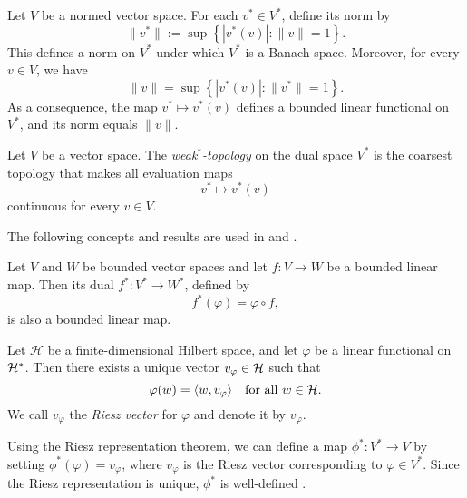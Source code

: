 

\begin{theorem} \cite[Theorem 4.3]{rudin91functional} %
Let \( V \) be a normed vector space. For each \( v^* \in V^* \), define its norm by
\[
\|v^*\| := \sup \left\{ | v^*(v) | : \|v\| = 1 \right\}.
\]
This defines a norm on \( V^* \) under which \( V^* \) is a Banach space. Moreover, for every \( v \in V \), we have
\[
\|v\| = \sup \left\{ | v^*(v) | : \|v^*\| = 1 \right\}.
\]
As a consequence, the map \( v^* \mapsto v^*(v)  \) defines a bounded linear functional on \( V^* \), and its norm equals \( \|v\| \).
\end{theorem}

\begin{definition} \label{def:weak*_top}
Let \( V \) be a vector space. The \emph{weak\(^*\)-topology} on the dual space \( V^* \) is the coarsest topology that makes all evaluation maps
\[
v^* \mapsto v^*(v) 
\]
continuous for every \( v \in V \).
\end{definition}




The following concepts and results are used in  and .

\begin{proposition} \cite[Proposition 2.3.10]{pedersenAnalysisNow1989}
  Let $V$ and $W$ be bounded vector spaces and let \( f : V \to W \) be a bounded linear map. Then its dual \( f^* : V^* \to W^* \), defined by
\[
f^*(\varphi) = \varphi \circ f,
\]
is also a bounded linear map.
\end{proposition}


\begin{theorem} \cite[Theorem 9.15]{romanAdvancedLinearAlgebra1992}
Let $\mathcal{H}$ be a finite-dimensional Hilbert space, and let $\varphi$ be a linear functional on $\mathcal{H}^*$. Then there exists a unique vector $v_\varphi \in \mathcal{H}$ such that
\[
\varphi(w) = \langle w, v_\varphi \rangle \quad \text{for all } w \in  \mathcal{H}.
\]
We call $v_\varphi$ the \emph{Riesz vector} for $\varphi$ and denote it by $v_\varphi$.\\
\end{theorem}


Using the Riesz representation theorem, we can define a map 
$\phi^* : V^* \to V$
by setting \(\phi^*(\varphi) = v_\varphi\), where \(v_\varphi\) is the Riesz vector corresponding to \(\varphi \in V^*\). Since the Riesz representation is unique, \(\phi^*\) is well-defined \cite{romanAdvancedLinearAlgebra1992}. 

